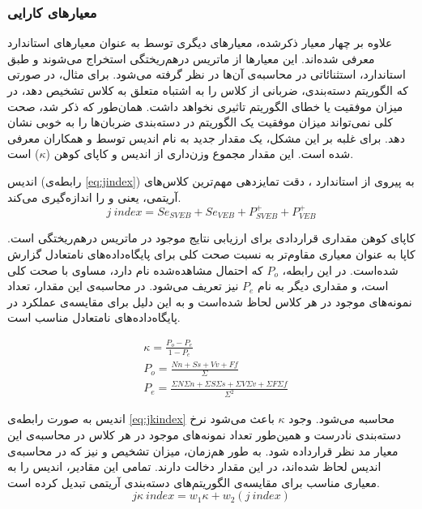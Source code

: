 \subsubsection{معیارهای کارایی}
\label{subsec:perf}
علاوه بر چهار معیار ذکرشده، معیارهای دیگری توسط  به عنوان معیارهای استاندارد معرفی شده‌اند. این معیارها از ماتریس درهم‌ریختگی استخراج می‌شوند و طبق  استاندارد‌، استثنائاتی در محاسبه‌ی آن‌ها در نظر گرفته می‌شود. برای مثال، در صورتی که الگوریتم دسته‌بندی، ضربانی از کلاس  را به اشتباه متعلق به کلاس  تشخیص دهد، در میزان موفقیت یا خطای الگوریتم تاثیری نخواهد داشت. 
همان‌طور که ذکر شد، صحت کلی نمی‌تواند میزان موفقیت یک الگوریتم در دسته‌بندی ضربان‌ها را به خوبی نشان دهد. برای غلبه بر این مشکل، یک مقدار جدید به نام اندیس  توسط  و همکاران معرفی شده است.\cite{Mar2011} این مقدار مجموع وزن‌داری از اندیس  و کاپای کوهن ($\kappa$) است.

اندیس  (رابطه‌ی \ref{eq:jindex}) به پیروی از استاندارد ، دقت تمایزدهی مهم‌ترین کلاس‌های آریتمی، یعنی  و  را اندازه‌گیری می‌کند.\cite{Mondejar}
\begin{equation}
	j\:index = Se_{SVEB} + Se_{VEB} + P^+_{SVEB} + P^+_{VEB}
	\label{eq:jindex}
\end{equation}

کاپای کوهن مقداری قراردادی برای ارزیابی نتایج موجود در ماتریس درهم‌ریختگی است. کاپا به عنوان معیاری مقاوم‌تر به نسبت صحت کلی برای پایگاه‌داده‌های نامتعادل گزارش شده‌است. در این رابطه، $P_o$ که احتمال مشاهده‌شده نام دارد، مساوی با صحت کلی است،‌ و مقداری دیگر به نام $P_e$ نیز تعریف می‌شود. در محاسبه‌ی این مقدار، تعداد نمونه‌های موجود در هر کلاس لحاظ شده‌است و به این دلیل برای مقایسه‌ی عملکرد در پایگاه‌داده‌های نامتعادل مناسب است. 

\begin{equation}
\begin{split}
	& \kappa = \frac{P_o - P_e}{1 - P_e} \\
	& P_o = \frac{Nn+Ss+Vv+Ff}{\Sigma} \\
	& P_e = \frac{\Sigma N \Sigma n + \Sigma S \Sigma s + \Sigma V \Sigma v + \Sigma F \Sigma f}{\Sigma^2}
\end{split}
\end{equation}

اندیس  به صورت رابطه‌ی \ref{eq:jkindex} محاسبه می‌شود. وجود $\kappa$ باعث می‌شود نرخ دسته‌بندی نادرست و همین‌طور تعداد نمونه‌های موجود در هر کلاس در محاسبه‌ی این معیار مد نظر قرارداده شود. به طور هم‌زمان، میزان تشخیص  و  نیز که در محاسبه‌ی اندیس  لحاظ شده‌اند،‌ در این مقدار دخالت دارند. تمامی این مقادیر،‌ اندیس  را به معیاری مناسب برای مقایسه‌ی الگوریتم‌های دسته‌بندی آریتمی تبدیل کرده است.  
\begin{equation}
	j\kappa\:index = w_1\kappa + w_2(j\:index)
\label{eq:jkindex}
\end{equation}



